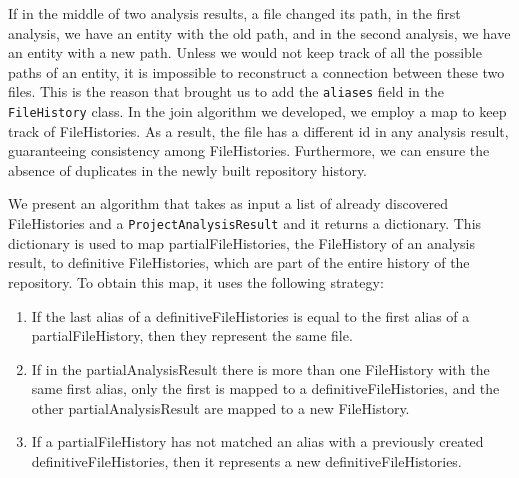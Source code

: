 If in the middle of two analysis results, a file changed its path, in the first analysis, we have an entity with the old path, 
and in the second analysis, we have an entity with a new path. 
Unless we would not keep track of all the possible paths of an entity, it is impossible to reconstruct a connection between these two files. 
This is the reason that brought us to add the \texttt{aliases} field in the \texttt{FileHistory} class. 
In the join algorithm we developed, we employ a map to keep track of FileHistories.
As a result, the file has a different id in any analysis result, guaranteeing consistency among FileHistories. Furthermore, we can ensure the absence of duplicates in the newly built repository history. 

We present an algorithm that takes as input a list of already discovered FileHistories and a \texttt{ProjectAnalysisResult} and it returns a dictionary.
This dictionary is used to map partialFileHistories, the FileHistory of an analysis result, to definitive FileHistories, which are part of the entire history of the repository. 
To obtain this map, it uses the following strategy:
\begin{enumerate}
    \item If the last alias of a definitiveFileHistories is equal to the first alias of a partialFileHistory, then they represent the same file.
    \item If in the partialAnalysisResult there is more than one FileHistory with the same first alias, only the first is mapped to a definitiveFileHistories, and the other partialAnalysisResult are mapped to a new FileHistory.
    \item If a partialFileHistory has not matched an alias with a previously created definitiveFileHistories, then it represents a new definitiveFileHistories.
\end{enumerate}

        

